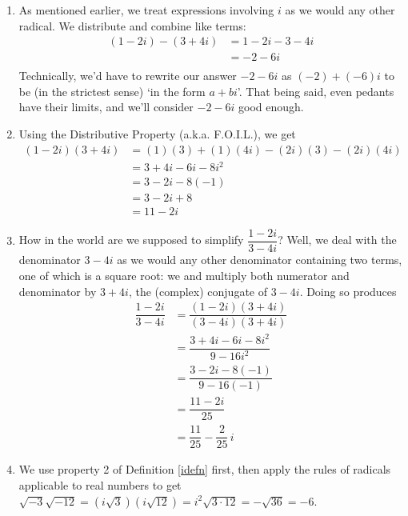 {
\begin{enumerate}

\item  As mentioned earlier, we treat expressions involving $i$ as we would any other radical. We distribute and combine like terms:
\begin{align*}
 (1-2i) - (3+4i) & =   1-2i-3-4i  \tag*{Distribute} \\
                 & =   -2 - 6i  \tag*{Gather like terms} \\
\end{align*}
Technically, we'd have to rewrite our answer  $-2-6i$ as $(-2) + (-6)i$ to be (in the strictest sense) `in the form $a+bi$'. That being said, even pedants have their limits, and we'll consider $-2-6i$ good enough.

\item  Using the Distributive Property (a.k.a. F.O.I.L.), we get 
\begin{align*}
  (1-2i)(3+4i)  & =  (1)(3) + (1)(4i) - (2i)(3) - (2i)(4i)  \tag*{F.O.I.L.} \\
	              & =  3+4i-6i-8i^2  \\
								& =  3 - 2i - 8(-1)  \tag*{$i^2=-1$} \\
								& =  3 - 2i + 8  \\
								& =  11 - 2i 
\end{align*}

\item  How in the world are we supposed to simplify $\dfrac{1-2i}{3-4i}$?  Well, we deal with the denominator $3-4i$ as we would any other denominator containing two terms, one of which is a square root: we and multiply both numerator and denominator by $3+4i$, the (complex) conjugate of $3 - 4i$.  Doing so produces
\begin{align*}
 \dfrac{1-2i}{3-4i} & =  \dfrac{(1-2i)(3+4i)}{(3-4i)(3+4i)}  \tag*{Equivalent Fractions} \\[5pt]
                    & =    \dfrac{3 + 4i - 6i - 8i^2}{9 - 16i^2}  \tag*{F.O.I.L.}\\[5pt]
					& =  \dfrac{3 - 2i - 8(-1)}{9  - 16(-1)}  \tag*{$i^2 = -1$}\\[5pt]
					& =  \dfrac{11 - 2i}{25} \\[5pt]
					& =  \dfrac{11}{25} - \dfrac{2}{25} \, i 
\end{align*}
										

\item  We use property 2 of Definition \ref{idefn} first, then apply the rules of radicals applicable to real numbers to get $\sqrt{-3} \sqrt{-12} = \left(i \sqrt{3}\right) \left(i \sqrt{12}\right) = i^2 \sqrt{3\cdot 12} = -\sqrt{36} = -6$.


\end{enumerate}}
